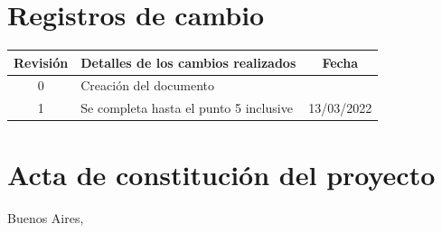 \documentclass[
11pt, %
codirector, %
]{charter}
\begin{document}
\maketitle
\thispagestyle{empty}
\pagebreak


\thispagestyle{empty}
{\setlength{\parskip}{0pt}
	\tableofcontents{}
}
\pagebreak


\section*{Registros de cambio}
\label{sec:registro}


\begin{table}[ht]
	\label{tab:registro}
	\centering
	\begin{tabularx}{\linewidth}{@{}|c|X|c|@{}}
		\hline
		\rowcolor[HTML]{C0C0C0}
		Revisión & \multicolumn{1}{c|}{\cellcolor[HTML]{C0C0C0}Detalles de los cambios realizados} & Fecha            \\ \hline
		0        & Creación del documento                                                          & \fechaInicioName \\ \hline
		1        & Se completa hasta el punto 5 inclusive                                          & 13/03/2022       \\ \hline
	\end{tabularx}
\end{table}

\pagebreak



\section*{Acta de constitución del proyecto}
\label{sec:acta}

\begin{flushright}
	Buenos Aires, \fechaInicioName
\end{flushright}
\end{document}
